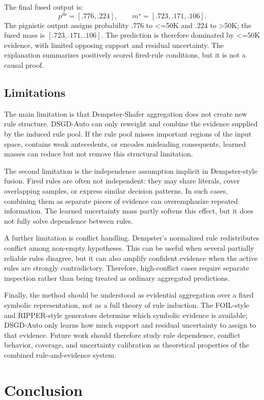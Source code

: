 \documentclass[conference]{IEEEtran}
\newcommand{\code}[1]{\textnormal{#1}}
\begin{document}
The final fused output is:
\[
  p^{\mathrm{ds}}=[.776,.224],
  \qquad
  m^\star=[.723,.171,.106].
\]
The pignistic output assigns probability $.776$ to \code{<=50K} and $.224$ to \code{>50K}; the fused mass is $[.723,.171,.106]$. The prediction is therefore dominated by \code{<=50K} evidence, with limited opposing support and residual uncertainty. The explanation summarizes positively scored fired-rule conditions, but it is not a causal proof.

\subsection{Limitations}

The main limitation is that Dempster-Shafer aggregation does not create new rule structure. DSGD-Auto can only reweight and combine the evidence supplied by the induced rule pool. If the rule pool misses important regions of the input space, contains weak antecedents, or encodes misleading consequents, learned masses can reduce but not remove this structural limitation.

The second limitation is the independence assumption implicit in Dempster-style fusion. Fired rules are often not independent: they may share literals, cover overlapping samples, or express similar decision patterns. In such cases, combining them as separate pieces of evidence can overemphasize repeated information. The learned uncertainty mass partly softens this effect, but it does not fully solve dependence between rules.

A further limitation is conflict handling. Dempster's normalized rule redistributes conflict among non-empty hypotheses. This can be useful when several partially reliable rules disagree, but it can also amplify confident evidence when the active rules are strongly contradictory. Therefore, high-conflict cases require separate inspection rather than being treated as ordinary aggregated predictions.

Finally, the method should be understood as evidential aggregation over a fixed symbolic representation, not as a full theory of rule induction. The FOIL-style and RIPPER-style generators determine which symbolic evidence is available; DSGD-Auto only learns how much support and residual uncertainty to assign to that evidence. Future work should therefore study rule dependence, conflict behavior, coverage, and uncertainty calibration as theoretical properties of the combined rule-and-evidence system.

\section{Conclusion}
\end{document}
